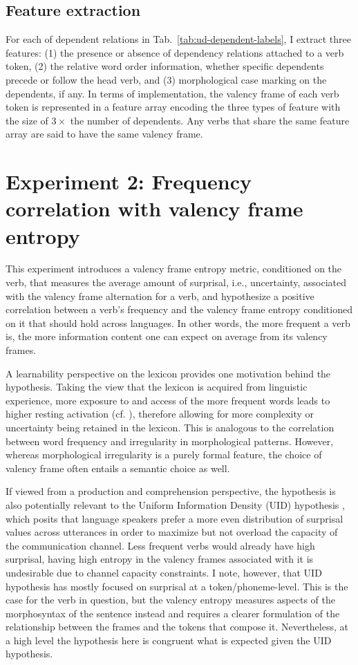 \subsection{Feature extraction}

For each of dependent relations in Tab.~\ref{tab:ud-dependent-labels}, I extract three features: (1) the presence or absence of dependency relations attached to a verb token, (2) the relative word order information, whether specific dependents precede or follow the head verb, and (3) morphological case marking on the dependents, if any. In terms of implementation, the valency frame of each verb token is represented in a feature array encoding the three types of feature with the size of $3\times$ the number of dependents. Any verbs that share the same feature array are said to have the same valency frame.

\section{Experiment 2: Frequency correlation with valency frame entropy}\label{sec:exp2-valency-frame-entropy}

This experiment introduces a valency frame entropy metric, conditioned on the verb, that measures the average amount of surprisal, i.e., uncertainty, associated with the valency frame alternation for a verb, and hypothesize a positive correlation between a verb's frequency and the valency frame entropy conditioned on it that should hold across languages. In other words, the more frequent a verb is, the more information content one can expect on average from its valency frames.

A learnability perspective on the lexicon provides one motivation behind the hypothesis. Taking the view that the lexicon is acquired from linguistic experience, more exposure to and access of the more frequent words leads to higher resting activation (cf. \citealp*{bybee1998}), therefore allowing for more complexity or uncertainty being retained in the lexicon. This is analogous to the correlation between word frequency and irregularity in morphological patterns. However, whereas morphological irregularity is a purely formal feature, the choice of valency frame often entails a semantic choice as well.

If viewed from a production and comprehension perspective, the hypothesis is also potentially relevant to the Uniform Information Density (UID) hypothesis \citep{fenk1980,levy2006}, which posits that language speakers prefer a more even distribution of surprisal values across utterances in order to maximize but not overload the capacity of the communication channel. Less frequent verbs would already have high surprisal, having high entropy in the valency frames associated with it is undesirable due to channel capacity constraints. I note, however, that UID hypothesis has mostly focused on surprisal at a token/phoneme-level. This is the case for the verb in question, but the valency entropy measures aspects of the morphosyntax of the sentence instead and requires a clearer formulation of the relationship between the frames and the tokens that compose it. Nevertheless, at a high level the hypothesis here is congruent what is expected given the UID hypothesis.

